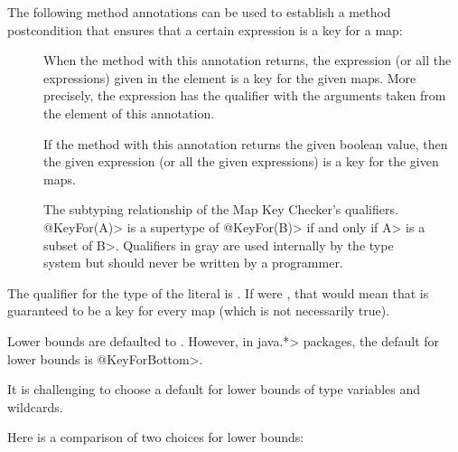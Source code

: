 The following method annotations can be used to establish a method postcondition
that ensures that a certain expression is a key for a map:

\begin{description}
\item[]
  When the method with this annotation returns, the expression (or all the
  expressions) given in the  element is a key for the given
  maps. More precisely, the expression has the  qualifier
  with the  arguments taken from the  element
  of this annotation.
\item[]
  If the method with this annotation returns the given boolean value,
  then the given expression (or all the given expressions)
  is a key for the given maps.
\end{description}

\begin{figure}
\caption{The subtyping relationship of the Map Key Checker's qualifiers.
\<@KeyFor(A)> is a supertype of \<@KeyFor(B)> if and only if \<A> is a subset of
\<B>.  Qualifiers in gray are used internally by the type system but should
never be written by a programmer.}
\label{fig-map-key-keyfor-hierarchy}
\end{figure}


The qualifier for the type of the  literal is .
If  were , that would mean that
 is guaranteed to be a key for every map (which is not
necessarily true).


Lower bounds are defaulted to .
However, in \<java.*> packages, the default for lower bounds is
\<@KeyForBottom>.

It is challenging to choose a default for lower bounds of type variables
and wildcards.

Here is a comparison of two choices for lower bounds:

\warpprintonly{\medskip}

